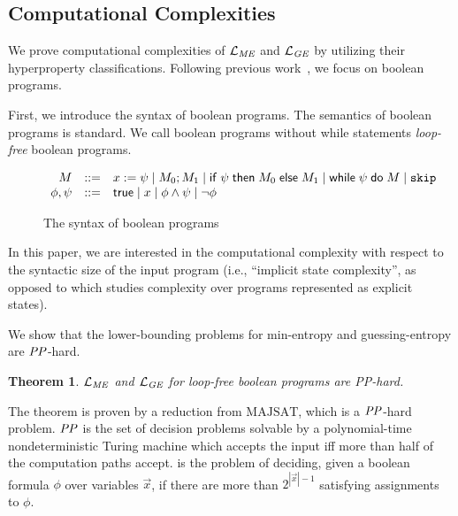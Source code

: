 \documentclass[]{eptcs}
\newtheorem{theorem}{Theorem}[section]
\newcommand{\addappendix}[2]{#2}
\newcommand{\ttskip}{\texttt{skip}}
\begin{document}
\subsection{Computational Complexities}
\label{sec:complower}

We prove computational complexities of $\mathcal{L}_{\it ME}$ and
$\mathcal{L}_{\it GE}$ by utilizing their hyperproperty
classifications.  Following previous
work~\cite{DBLP:conf/csfw/YasuokaT10,DBLP:conf/esorics/YasuokaT10,DBLP:conf/csfw/CernyCH11},
we focus on boolean programs.

First, we introduce the syntax of boolean programs.  \addappendix{The
  semantics of boolean programs is standard and is deferred to
  Appendix (Figure~\ref{fig:semantics}).}{The semantics of boolean
  programs is standard.}  We call boolean programs without {\sf while}
statements {\em loop-free} boolean programs.
\begin{figure}[h]
\[
\begin{array}[t]{rcl}
  M & ::= &x:=\psi\mid M_0 ; M_1 
  \mid {\sf if}\; \psi\;{\sf then}\; M_0 \;{\sf else}\; M_1
  \mid {\sf while}\;\psi\;{\sf do}\;M\mid\ttskip \\
  \phi,\psi&::=&{\sf true}\mid x\mid \phi\wedge \psi\mid \neg \phi
\end{array}
\]
\caption{The syntax of boolean programs}
\label{fig:syntax}
\end{figure}

In this paper, we are interested in the computational complexity with
respect to the syntactic size of the input program (i.e., ``implicit
state complexity'', as opposed to \cite{DBLP:conf/csfw/CernyCH11}
which studies complexity over programs represented as explicit
states).

We show that the lower-bounding problems for min-entropy and
guessing-entropy are ${\it PP}$-hard.
\begin{theorem}
\label{thm:lmelgepp}
$\mathcal{L}_{\it ME}$ and $\mathcal{L}_{\it GE}$ for loop-free
boolean programs are {\it PP}-hard.
\end{theorem}
The theorem is proven by a reduction from ${\text{MAJSAT}}$, which is
a ${\it PP}$-hard problem.  ${\it PP}$ is the set of decision problems
solvable by a polynomial-time nondeterministic Turing machine which
accepts the input iff more than half of the computation paths accept.
{} is the problem of deciding, given a boolean formula
$\phi$ over variables $\overrightarrow x$, if there are more than
$2^{|\overrightarrow x|-1}$ satisfying assignments to $\phi$.
\end{document}

